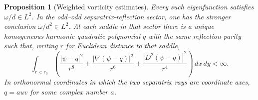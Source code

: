 \documentclass[reqno,11pt]{amsart}
\numberwithin{equation}{section}
\newtheorem{proposition}[theorem]{Proposition}
\theoremstyle{remark}
\begin{document}
\begin{proposition}[Weighted vorticity estimates]
\label{prop:saddle-gains}
Every such eigenfunction satisfies $\omega/d\in L^2$.
In the odd--odd separatrix-reflection sector,
one has the stronger conclusion $\omega/d^2\in L^2$.
At each saddle in that sector there is a unique homogeneous harmonic
quadratic polynomial $q$ with the same reflection parity such that,
writing $r$ for Euclidean distance to that saddle,
\begin{equation}
 \int_{r<r_0}\left(
 \frac{|\psi-q|^2}{r^8}
 +\frac{|\nabla(\psi-q)|^2}{r^6}
 +\frac{|D^2(\psi-q)|^2}{r^4}\right)\,dx\,dy<\infty.
 \label{eq:quadratic-saddle-jet}
\end{equation}
In orthonormal coordinates in which the two separatrix rays are
coordinate axes, $q=a uv$ for some complex number $a$.
\end{proposition}
\end{document}
